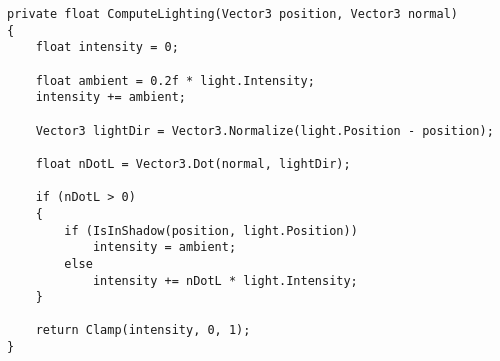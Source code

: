 \begin{center}
\captionsetup{justification=raggedright,singlelinecheck=off}
\begin{lstlisting}[label=lst:guro,caption=Реализация модели освещения Ламберта,numbers=none]
private float ComputeLighting(Vector3 position, Vector3 normal)
{
    float intensity = 0;

    float ambient = 0.2f * light.Intensity;
    intensity += ambient;

    Vector3 lightDir = Vector3.Normalize(light.Position - position);

    float nDotL = Vector3.Dot(normal, lightDir);

    if (nDotL > 0)
    {
        if (IsInShadow(position, light.Position))
            intensity = ambient;
        else
            intensity += nDotL * light.Intensity;
    }

    return Clamp(intensity, 0, 1);
}
\end{lstlisting}
\end{center}

